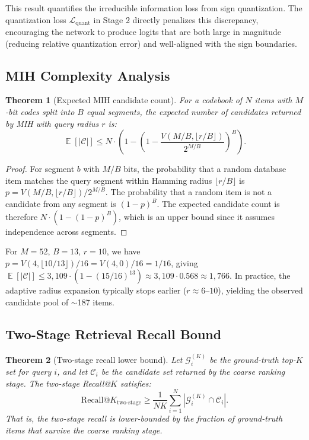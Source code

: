 \documentclass[11pt,a4paper]{article}
\newtheorem{theorem}{Theorem}
\DeclareMathOperator{\E}{\mathbb{E}}
\begin{document}
This result quantifies the irreducible information loss from sign quantization. The quantization loss $\mathcal{L}_{\text{quant}}$ in Stage 2 directly penalizes this discrepancy, encouraging the network to produce logits that are both large in magnitude (reducing relative quantization error) and well-aligned with the sign boundaries.

\subsection{MIH Complexity Analysis}

\begin{theorem}[Expected MIH candidate count]\label{thm:mih-complexity}
For a codebook of $N$ items with $M$-bit codes split into $B$ equal segments, the expected number of candidates returned by MIH with query radius $r$ is:
\begin{equation}
    \E[|\mathcal{C}|] \leq N \cdot \left(1 - \left(1 - \frac{V(M/B, \lfloor r/B \rfloor)}{2^{M/B}}\right)^B\right).
\end{equation}
\end{theorem}

\begin{proof}
For segment $b$ with $M/B$ bits, the probability that a random database item matches the query segment within Hamming radius $\lfloor r/B \rfloor$ is $p = V(M/B, \lfloor r/B \rfloor) / 2^{M/B}$. The probability that a random item is not a candidate from any segment is $(1-p)^B$. The expected candidate count is therefore $N \cdot (1 - (1-p)^B)$, which is an upper bound since it assumes independence across segments.
\end{proof}

For $M=52$, $B=13$, $r=10$, we have $p = V(4, \lfloor 10/13 \rfloor) / 16 = V(4,0) / 16 = 1/16$, giving $\E[|\mathcal{C}|] \leq 3{,}109 \cdot (1 - (15/16)^{13}) \approx 3{,}109 \cdot 0.568 \approx 1{,}766$. In practice, the adaptive radius expansion typically stops earlier ($r \approx 6$--$10$), yielding the observed candidate pool of $\sim$187 items.

\subsection{Two-Stage Retrieval Recall Bound}

\begin{theorem}[Two-stage recall lower bound]\label{thm:two-stage}
Let $\mathcal{G}_i^{(K)}$ be the ground-truth top-$K$ set for query $i$, and let $\mathcal{C}_i$ be the candidate set returned by the coarse ranking stage. The two-stage Recall@$K$ satisfies:
\begin{equation}
    \text{Recall@}K_{\text{two-stage}} \geq \frac{1}{NK} \sum_{i=1}^{N} |\mathcal{G}_i^{(K)} \cap \mathcal{C}_i|.
\end{equation}
That is, the two-stage recall is lower-bounded by the fraction of ground-truth items that survive the coarse ranking stage.
\end{theorem}
\end{document}
